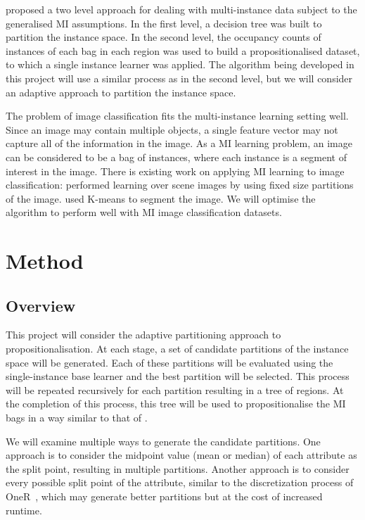 \documentclass[a4paper,12pt]{article} %
\begin{document}
 proposed a two level approach for dealing with multi-instance data subject to the generalised MI assumptions. In the first level, a decision tree was built to partition the instance space. In the second level, the occupancy counts of instances of each bag in each region was used to build a propositionalised dataset, to which a single instance learner was applied.
The algorithm being developed in this project will use a similar process as  in the second level, but we will consider an adaptive approach to partition the instance space.

The problem of image classification fits the multi-instance learning setting well. Since an image may contain multiple objects, a single feature vector may not capture all of the information in the image. As a MI learning problem, an image can be considered to be a bag of instances, where each instance is a segment of interest in the image. There is existing work on applying MI learning to image classification:  performed learning over scene images by using fixed size partitions of the image.  used K-means to segment the image. We will optimise the algorithm to perform well with MI image classification datasets.


\section{Method}

\subsection{Overview}
This project will consider the adaptive partitioning approach to propositionalisation.
At each stage, a set of candidate partitions of the instance space will be generated. Each of these partitions will be evaluated using the  single-instance base learner and the best partition will be selected. This process will be repeated recursively for each partition resulting in a tree of regions. At the completion of this process, this tree will be used to propositionalise the MI bags in a way similar to that of .

We will examine multiple ways to generate the candidate partitions. One approach is to consider the midpoint value (mean or median) of each attribute as the split point, resulting in multiple partitions. Another approach is to consider every possible split point of the attribute, similar to the discretization process of OneR~\cite{holte}, which may generate better partitions but at the cost of increased runtime.
\end{document}
